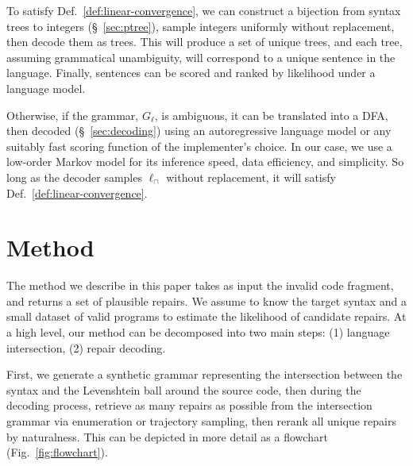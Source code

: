 \documentclass[runningheads]{llncs}
\begin{document}
  To satisfy Def.~\ref{def:linear-convergence}, we can construct a bijection from syntax trees to integers (\S~\ref{sec:ptree}), sample integers uniformly without replacement, then decode them as trees. This will produce a set of unique trees, and each tree, assuming grammatical unambiguity, will correspond to a unique sentence in the language.  Finally, sentences can be scored and ranked by likelihood under a language model.

  Otherwise, if the grammar, $G_\ell$, is ambiguous, it can be translated into a DFA, then decoded (\S~\ref{sec:decoding}) using an autoregressive language model or any suitably fast scoring function of the implementer's choice. In our case, we use a low-order Markov model for its inference speed, data efficiency, and simplicity. So long as the decoder samples $\ell_\cap$ without replacement, it will satisfy Def.~\ref{def:linear-convergence}.


  \section{Method}

  The method we describe in this paper takes as input the invalid code fragment, and returns a set of plausible repairs. We assume to know the target syntax and a small dataset of valid programs to estimate the likelihood of candidate repairs. At a high level, our method can be decomposed into two main steps: (1) language intersection, (2) repair decoding.

First, we generate a synthetic grammar representing the intersection between the syntax and the Levenshtein ball around the source code, then during the decoding process, retrieve as many repairs as possible from the intersection grammar via enumeration or trajectory sampling, then rerank all unique repairs by naturalness. This can be depicted in more detail as a flowchart (Fig.~\ref{fig:flowchart}).
\end{document}
